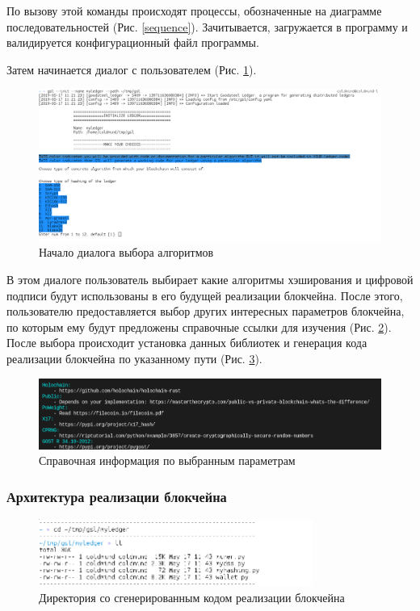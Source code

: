 По вызову этой команды происходят процессы, обозначенные на диаграмме
последовательностей (Рис.  \ref{sequence}). Зачитывается, загружается в
программу и валидируется конфигурационный файл программы.

\newpage

Затем начинается диалог с пользователем (Рис. \ref{dialog}).
\begin{figure}[h]
    \centering
    \includegraphics[width=\textwidth]{images/dialog_start}
    \caption{Начало диалога выбора алгоритмов}\label{dialog}
\end{figure}

В этом диалоге пользователь выбирает какие алгоритмы хэширования и цифровой
подписи будут использованы в его будущей реализации блокчейна. После этого,
пользователю предоставляется выбор других интересных параметров блокчейна, по
которым ему будут предложены справочные ссылки для изучения (Рис. \ref{sprav}).
После выбора происходит установка данных библиотек и генерация кода реализации
блокчейна по указанному пути (Рис. \ref{ll}).

\begin{figure}[h]
    \centering
    \includegraphics[width=\textwidth]{images/spravochno}
    \caption{Справочная информация по выбранным параметрам}\label{sprav}
\end{figure}

\subsubsection{Архитектура реализации блокчейна}
\begin{figure}[h]
    \centering
    \includegraphics[width=0.8\textwidth]{images/ledger_ll}
    \caption{Директория со сгенерированным кодом реализации блокчейна}\label{ll}
\end{figure}

